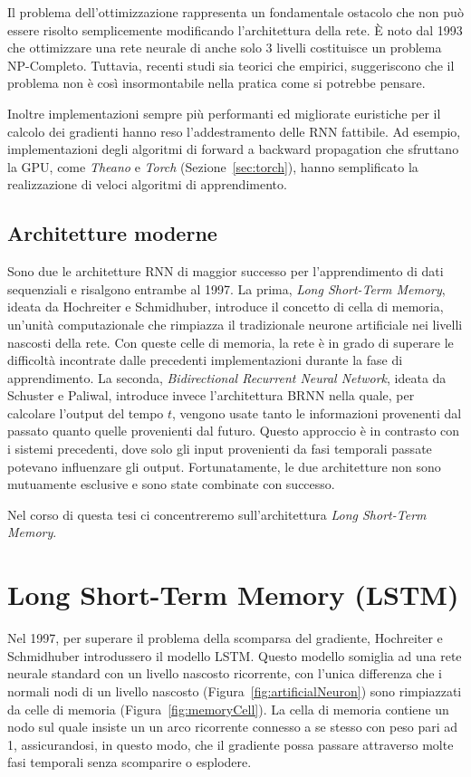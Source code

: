 Il problema dell'ottimizzazione rappresenta un fondamentale ostacolo che non pu\`o essere risolto semplicemente modificando l'architettura della rete.
\`E noto dal 1993 che ottimizzare una rete neurale di anche solo 3 livelli costituisce un problema NP-Completo.
Tuttavia, recenti studi sia teorici che empirici, suggeriscono che il problema non \`e cos\`i insormontabile nella pratica come si potrebbe pensare.

Inoltre implementazioni sempre pi\`u performanti ed migliorate euristiche per il calcolo dei gradienti hanno reso l'addestramento delle RNN fattibile.
Ad esempio, implementazioni degli algoritmi di forward a backward propagation che sfruttano la GPU, come \emph{Theano} e \emph{Torch} (Sezione~\ref{sec:torch}), hanno semplificato la realizzazione di veloci algoritmi di apprendimento.

\subsection{Architetture moderne}
Sono due le architetture RNN di maggior successo per l'apprendimento di dati sequenziali e risalgono entrambe al 1997.
La prima, \emph{Long Short-Term Memory}, ideata da Hochreiter e Schmidhuber, introduce il concetto di cella di memoria, un'unit\`a computazionale che rimpiazza il tradizionale neurone artificiale nei livelli nascosti della rete.
Con queste celle di memoria, la rete \`e in grado di superare le difficolt\`a incontrate dalle precedenti implementazioni durante la fase di apprendimento.
La seconda, \emph{Bidirectional Recurrent Neural Network}, ideata da Schuster e Paliwal, introduce invece l'architettura BRNN nella quale, per calcolare l'output del tempo $t$, vengono usate tanto le informazioni provenenti dal passato quanto quelle provenienti dal futuro.
Questo approccio \`e in contrasto con i sistemi precedenti, dove solo gli input provenienti da fasi temporali passate potevano influenzare gli output.
Fortunatamente, le due architetture non sono mutuamente esclusive e sono state combinate con successo.

Nel corso di questa tesi ci concentreremo sull'architettura \emph{Long Short-Term Memory}.

\section{Long Short-Term Memory (LSTM)}
Nel 1997, per superare il problema della scomparsa del gradiente, Hochreiter e Schmidhuber introdussero il modello LSTM.
Questo modello somiglia ad una rete neurale standard con un livello nascosto ricorrente, con l'unica differenza che i normali nodi di un livello nascosto (Figura~\ref{fig:artificialNeuron}) sono rimpiazzati da celle di memoria (Figura~\ref{fig:memoryCell}). %
La cella di memoria contiene un nodo sul quale insiste un un arco ricorrente connesso a se stesso con peso pari ad 1, assicurandosi, in questo modo, che il gradiente possa passare attraverso molte fasi temporali senza scomparire o esplodere.

